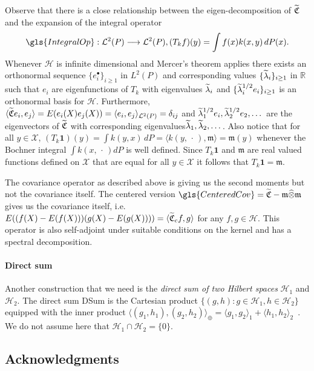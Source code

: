 \documentclass[AHL,Unicode,longabstracts,published]{cedram}
\theoremstyle{remark}
\newcommand{\R}{\mathbb{R}}
\newcommand{\X}{\mathcal{X}}
\newcommand{\cH}{\mathcal{H}}
\newcommand{\clL}{\mathcal{L}}
\newcommand{\fkC}{\mathfrak{C}}
\newcommand{\mean}{\mathfrak{m}}
\let\oldtilde\tilde
\renewcommand*{\tilde}[1]{\mathchoice{\widetilde{#1}}{\widetilde{#1}}{\oldtilde{#1}}{\oldtilde{#1}}}
\renewcommand*{\to}{\mathchoice{\longrightarrow}{\rightarrow}{\rightarrow}{\rightarrow}}
\begin{document}
Observe that there is a close relationship between the eigen-decomposition of $\tilde{\fkC}$ and the expansion of the integral operator
\[
\gls{IntegralOp}: \clL^2(P) \to \clL^2(P), (T_k f)(y) = \int f(x) k(x,y) \, dP(x).
\]
Whenever $\cH$ is infinite dimensional and Mercer's theorem applies there exists an orthonormal sequence $\{e_i^\bullet\}_{i \geq 1}$ in $L^2(P)$ and corresponding values $\{\tilde \lambda_i\}_{i \geq 1}$ in $\R$ such that $e_i$ are eigenfunctions of $T_k$ with eigenvalues $\tilde \lambda_i$ and $\{\tilde \lambda_i^{1/2} e_i\}_{i\geq 1}$ is an orthonormal basis for $\cH$. Furthermore, $\langle \tilde{\fkC} e_i, e_j \rangle = E(e_i(X) e_j(X)) = \langle e_i, e_j \rangle_{\clL^2(P)} = \delta_{ij}$ and $\tilde \lambda_1^{1/2} e_i, \tilde \lambda_2^{1/2} e_2, \dots$ are the eigenvectors of $\tilde{\fkC}$ with corresponding eigenvalues\linebreak $\tilde \lambda_1, \tilde \lambda_2, \dots$. Also notice that for all $y\in \X$, $(T_k\bm 1)(y) = \int k(y,x) \, dP = \langle k(y,\,\cdot\,), \mean \rangle = \mean(y)$ whenever the Bochner integral $\int k(x,\,\cdot\,) dP$ is well defined. Since $T_k \bm 1$ and $\mean$ are real valued functions defined on $\X$ that are equal for all $y \in \X$ it follows that $T_k \bm 1 = \mean$.

The covariance operator as described above is giving us the second moments but not the covariance itself. The centered version $ \gls{CenteredCov}= \tilde{\fkC} - \mean \widehat{\otimes} \mean$ gives us the covariance itself, i.e. $E((f(X) - E(f(X)))(g(X) - E(g(X)))) = \langle \tilde{\fkC}_c f,g \rangle$ for any $f,g \in \cH$. This operator is also self-adjoint under suitable conditions on the kernel and has a spectral decomposition.


\paragraph{Direct sum}

Another construction that we need is the \emph{direct sum of two Hilbert spaces} $\cH_1$ and $\cH_2$. The direct sum
\gls{DSum} is the Cartesian product $\{(g,h) : g \in \cH_1, h\in \cH_2\}$ equipped with the inner product $\langle (g_1,h_1), (g_2,h_2) \rangle_{\oplus} = \langle g_1, g_2\rangle_1 + \langle h_1, h_2 \rangle_2$~\cite[p.~40, Example~5]{REED72}. We do not assume here that $\cH_1 \cap \cH_2 = \{0\}$.

\subsection*{Acknowledgments}
\end{document}
